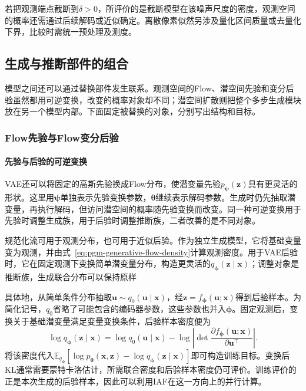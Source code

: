 若把观测端点截断到$\delta>0$，所评价的是截断模型在该噪声尺度的密度，观测空间的概率还需通过后续解码或近似确定。离散像素似然另涉及量化区间质量或去量化下界，比较时需统一预处理及测度。

\subsection{生成与推断部件的组合}
\label{sec:pgm-generative-component-combinations}

模型之间还可以通过替换部件发生联系。观测空间的Flow、潜空间先验和变分后验虽然都用可逆变换，改变的概率对象却不同；潜空间扩散则把整个多步生成模块放在另一个模型内部。下面固定被替换的对象，分别写出结构和目标。

\subsubsection{Flow先验与Flow变分后验}
\label{sec:pgm-generative-flow-roles}

\paragraph{先验与后验的可逆变换}

VAE还可以将固定的高斯先验换成Flow分布，使潜变量先验$p_{\bm{\psi}}(\bm{z})$具有更灵活的形状。这里用$\bm\psi$单独表示先验变换参数，$\bm\theta$继续表示解码参数。生成时仍先抽取潜变量，再执行解码，但访问潜空间的概率随先验变换而改变。同一种可逆变换用于先验时调整生成族，用于后验时调整推断族，二者改善的是不同对象。


规范化流可用于观测分布，也可用于近似后验。作为独立生成模型，它将基础变量变为观测，并由式~\eqref{eq:pgm-generative-flow-density}计算观测密度。用于VAE后验时，它在固定观测下变换简单潜变量分布，构造更灵活的$q_{\bm{\phi}}(\bm{z}\mid\bm{x})$；调整对象是推断族，生成联合分布可以保持原样

具体地，从简单条件分布抽取$\bm{u}\sim q_0(\bm{u}\mid\bm{x})$，经$\bm{z}=f_{\bm{\phi}}(\bm{u};\bm{x})$得到后验样本。为简化记号，$q_0$省略了可能包含的编码器参数，这些参数也并入$\bm\phi$。固定观测后，变换关于基础潜变量满足变量变换条件，后验样本密度便为
\begin{equation}
  \label{eq:pgm-generative-flow-posterior}
  \log q_{\bm{\phi}}(\bm{z}\mid\bm{x})
  =\log q_0(\bm{u}\mid\bm{x})
    -\log\left|
       \det\frac{\partial f_{\bm{\phi}}(\bm{u};\bm{x})}
                     {\partial\bm{u}^{\top}}
      \right|.
\end{equation}
将该密度代入$\mathbb{E}_{q_{\bm{\phi}}}[\log p_{\bm{\theta}}(\bm{x},\bm{z})-\log q_{\bm{\phi}}(\bm{z}\mid\bm{x})]$即可构造训练目标。变换后KL通常需要蒙特卡洛估计，所需联合密度和后验样本密度仍可评价。训练评价的正是本次生成的后验样本，因此可以利用IAF在这一方向上的并行计算。

